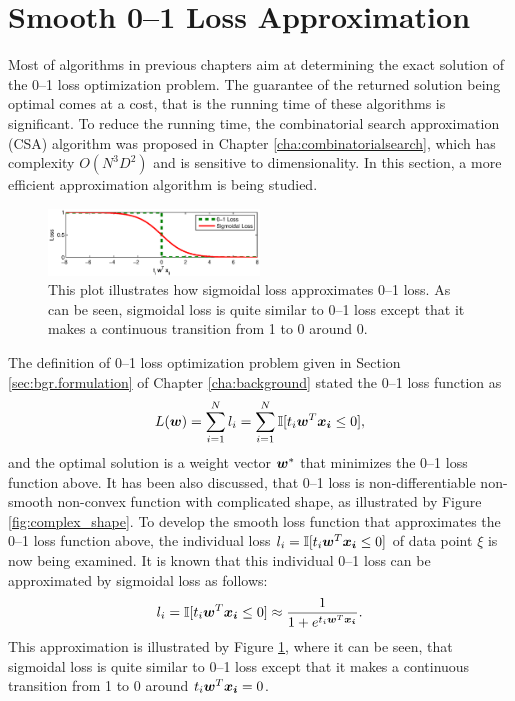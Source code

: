 \section{Smooth 0--1 Loss Approximation}
\label{cha:Smoothlossapprox}

Most of algorithms in previous chapters aim at determining the exact
solution of the 0--1 loss optimization problem. The guarantee of the
returned solution being optimal comes at a cost, that is the running
time of these algorithms is significant. To reduce the running time,
the combinatorial search approximation (CSA) algorithm was proposed in
Chapter \ref{cha:combinatorialsearch}, which has complexity
$O(N^3D^2)$ and is sensitive to dimensionality. In this section, a
more efficient approximation algorithm is being studied.

\begin{figure}[here]
\includegraphics[width=0.50\textwidth]{images/fig51_sigmoid.eps}
\caption{
This plot illustrates how sigmoidal loss approximates 0--1 loss. As can be seen, sigmoidal loss is quite similar to 0--1 loss except that it makes a continuous transition from 1 to 0 around 0.
}
\label{fig:sla.sigmoid}
\end{figure}

The definition of 0--1 loss optimization problem given in Section \ref{sec:bgr.formulation} of Chapter \ref{cha:background} stated the 0--1 loss function as 
$$L(\boldsymbol{w}) = \sum_{i=1}^N l_i = \sum_{i=1}^N \mathbb{I} [t_i \boldsymbol{w}^T \boldsymbol{x_i}
  \leq 0],$$ and the optimal solution is a weight vector $\boldsymbol{w}^*$ that
minimizes the 0--1 loss function above. It has been also discussed,
that 0--1 loss is non-differentiable non-smooth non-convex function
with complicated shape, as illustrated by Figure
\ref{fig:complex_shape}. To develop the smooth loss function that
approximates the 0--1 loss function above, the individual loss $l_i =
\mathbb{I} [t_i \boldsymbol{w}^T \boldsymbol{x_i} \leq 0]$ of data point $\xi$ is now being
examined. It is known that this individual 0--1 loss can be
approximated by sigmoidal loss as follows:
$$l_i = \mathbb{I} [t_i \boldsymbol{w}^T \boldsymbol{x_i} \leq 0] \approx \frac{1}{1 + e^{t_i \boldsymbol{w}^T \boldsymbol{x_i} }}.$$
This approximation is illustrated by Figure \ref{fig:sla.sigmoid}, where it can be seen, that sigmoidal loss is quite similar to 0--1 loss except that it makes a continuous transition from 1 to 0 around $t_i \boldsymbol{w}^T \boldsymbol{x_i} = 0$. 

